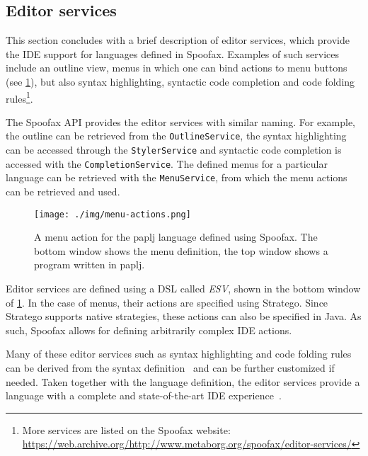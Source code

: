 \subsection{Editor services}
\label{ssec:editor-serv}
This section concludes with a brief description of editor services,
which provide the IDE support for languages defined in
Spoofax. Examples of such services include an outline view, menus in
which one can bind actions to menu buttons (see
\cref{fig:menu-actions}), but also syntax highlighting, syntactic code
completion and code folding rules\footnote{More services are
listed on the Spoofax website:
\url{https://web.archive.org/http://www.metaborg.org/spoofax/editor-services/}}.

The Spoofax API provides the editor services with similar naming. For
example, the outline can be retrieved from the \texttt{OutlineService}, the
syntax highlighting can be accessed through the \texttt{StylerService} and
syntactic code completion is accessed with the
\texttt{CompletionService}. The defined menus for a particular language can
be retrieved with the \texttt{MenuService}, from which the menu actions can
be retrieved and used.

\begin{figure}[bt]
\centering
\texttt{[image: ./img/menu-actions.png]}
\caption{\label{fig:menu-actions}
A menu action for the paplj language defined using Spoofax. The bottom window shows the menu definition, the top window shows a program written in paplj.}
\end{figure}

Editor services are defined using a DSL called \textit{ESV}, shown in the bottom
window of \cref{fig:menu-actions}. In the case of menus, their actions are
specified using Stratego. Since Stratego supports native strategies, these
actions can also be specified in Java. As such, Spoofax allows for defining
arbitrarily complex IDE actions.

Many of these editor services such as syntax highlighting and code
folding rules can be derived from the syntax
definition~\cite{Kats10c} and can be further customized if
needed. Taken together with the language definition, the editor
services provide a language with a complete and state-of-the-art IDE
experience~\cite{Kats10a}.
